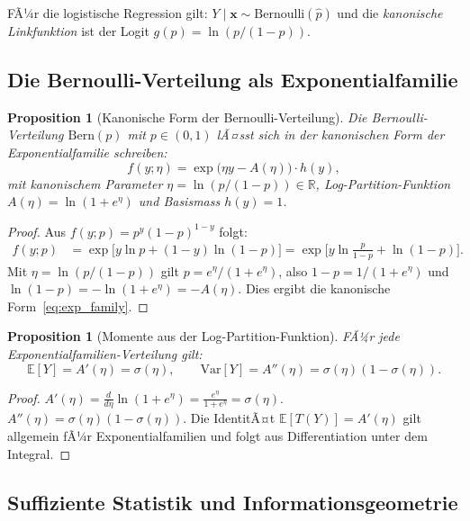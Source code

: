 ﻿\documentclass[12pt, a4paper]{article}
\newtheorem{proposition}[theorem]{Proposition}
\theoremstyle{definition}
\theoremstyle{remark}
\newcommand{\R}{\mathbb{R}}
\newcommand{\E}{\mathbb{E}}
\newcommand{\sigmoid}{\sigma}
\newcommand{\vx}{\bm{x}}
\begin{document}
FÃ¼r die logistische Regression gilt: $Y\mid\vx \sim \mathrm{Bernoulli}(\hat{p})$ und die
\emph{kanonische Linkfunktion} ist der Logit $g(p) = \ln(p/(1-p))$.

\subsection{Die Bernoulli-Verteilung als Exponentialfamilie}

\begin{proposition}[Kanonische Form der Bernoulli-Verteilung]
  Die Bernoulli-Verteilung $\mathrm{Bern}(p)$ mit $p \in (0,1)$ lÃ¤sst sich in der kanonischen
  Form der Exponentialfamilie schreiben:
  \begin{equation}
    f(y;\eta) = \exp\!\bigl(\eta y - A(\eta)\bigr) \cdot h(y),
    \label{eq:exp_family}
  \end{equation}
  mit kanonischem Parameter $\eta = \ln(p/(1-p)) \in \R$, Log-Partition-Funktion
  $A(\eta) = \ln(1+e^\eta)$ und Basismass $h(y) = 1$.
\end{proposition}

\begin{proof}
  Aus $f(y;p) = p^y(1-p)^{1-y}$ folgt:
  \begin{align*}
    f(y;p) &= \exp\!\bigl[y\ln p + (1-y)\ln(1-p)\bigr]
            = \exp\!\bigl[y\ln\tfrac{p}{1-p} + \ln(1-p)\bigr].
  \end{align*}
  Mit $\eta = \ln(p/(1-p))$ gilt $p = e^\eta/(1+e^\eta)$, also $1-p = 1/(1+e^\eta)$ und
  $\ln(1-p) = -\ln(1+e^\eta) = -A(\eta)$. Dies ergibt die kanonische Form~\eqref{eq:exp_family}. 
\end{proof}

\begin{proposition}[Momente aus der Log-Partition-Funktion]
  FÃ¼r jede Exponentialfamilien-Verteilung gilt:
  \[
    \E[Y] = A'(\eta) = \sigmoid(\eta), \qquad \mathrm{Var}[Y] = A''(\eta) = \sigmoid(\eta)(1-\sigmoid(\eta)).
  \]
\end{proposition}

\begin{proof}
  $A'(\eta) = \frac{d}{d\eta}\ln(1+e^\eta) = \frac{e^\eta}{1+e^\eta} = \sigmoid(\eta)$.
  $A''(\eta) = \sigmoid(\eta)(1-\sigmoid(\eta))$. Die IdentitÃ¤t $\E[T(Y)] = A'(\eta)$ gilt
  allgemein fÃ¼r Exponentialfamilien und folgt aus Differentiation unter dem Integral. 
\end{proof}

\subsection{Suffiziente Statistik und Informationsgeometrie}
\end{document}
